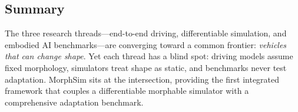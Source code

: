 \subsection{Summary}

The three research threads---end-to-end driving, differentiable simulation, and embodied AI benchmarks---are converging toward a common frontier: \emph{vehicles that can change shape}. Yet each thread has a blind spot: driving models assume fixed morphology, simulators treat shape as static, and benchmarks never test adaptation. MorphSim sits at the intersection, providing the first integrated framework that couples a differentiable morphable simulator with a comprehensive adaptation benchmark.
